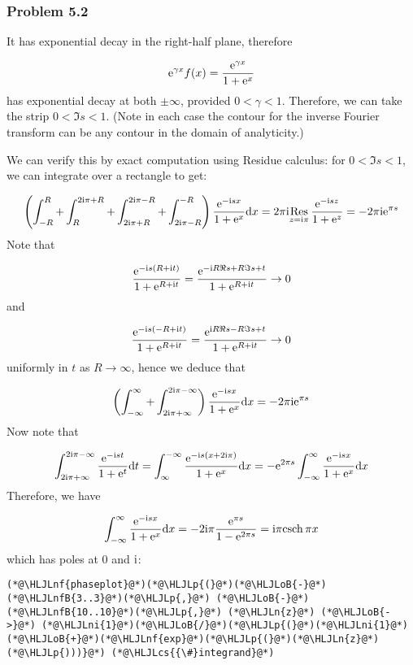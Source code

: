 \documentclass[12pt,a4paper]{article}
\newcommand{\HLJLn}[1]{#1}
\newcommand{\HLJLnf}[1]{\textcolor[RGB]{66,102,213}{#1}}
\newcommand{\HLJLnfB}[1]{\textcolor[RGB]{59,151,46}{#1}}
\newcommand{\HLJLni}[1]{\textcolor[RGB]{59,151,46}{#1}}
\newcommand{\HLJLoB}[1]{\textcolor[RGB]{102,102,102}{\textbf{#1}}}
\newcommand{\HLJLp}[1]{#1}
\newcommand{\HLJLcs}[1]{\textcolor[RGB]{153,153,119}{\textit{#1}}}
\def\D{ {\rm d} }
\def\I{ {\rm i} }
\def\E{ {\rm e} }
\def\Res_#1{\underset{#1}{\rm Res}\,}
\def\dx{\D x}
\def\dt{\D t}
\begin{document}
\subsubsection{Problem 5.2}
It has exponential decay in the right-half plane, therefore

\[
\E^{\gamma x} f(x) = {\E^{\gamma x } \over 1 + \E^x}
\]
has exponential decay at both $\pm \infty$, provided $0 < \gamma < 1$. Therefore, we can take the strip $0 < \Im s < 1$.  (Note in each case the contour for the inverse Fourier transform can be any contour in the domain of analyticity.)

We can verify this by exact computation using Residue calculus: for $0 < \Im s < 1$, we can integrate over a rectangle to get:

\[
\left(\int_{-R}^R + \int_R^{2\I \pi + R} +  \int_{2 \I \pi + R}^{2\I \pi - R} + \int_{2 \I \pi - R}^{-R} \right) {\E^{-\I s x} \over 1 + \E^x} \dx = 2 \pi \I \Res_{z = \I \pi } {\E^{-\I s z} \over 1 + \E^z} =
- 2 \pi \I \E^{\pi s}
\]
Note that

\[
{\E^{-\I s (R + \I t)} \over 1 + \E^{R + \I t}} =
{\E^{-\I R \Re s + R \Im s  + t} \over 1 + \E^{R + \I t}} \rightarrow 0
\]
and

\[
{\E^{-\I s (-R + \I t)} \over 1 + \E^{R + \I t}} =
{\E^{\I R \Re s - R \Im s + t} \over 1 + \E^{R + \I t}} \rightarrow 0
\]
uniformly in $t$ as $R \rightarrow \infty$, hence we deduce that

\[
\left(\int_{-\infty}^\infty  +  \int_{2 \I \pi + \infty}^{2\I \pi - \infty}\right) {\E^{-\I s x} \over 1 + \E^x} \dx  =
- 2 \pi \I \E^{\pi s}
\]
Now note that

\[
\int_{2 \I \pi + \infty}^{2\I \pi - \infty} {\E^{-\I s t} \over 1 + \E^t} \dt  = \int_{\infty}^{-\infty} {\E^{-\I s (x+2 \I \pi)} \over 1 + \E^x} \dx = -\E^{2 \pi s} \int_{-\infty}^\infty  {\E^{-\I s x} \over 1 + \E^x} \dx
\]
Therefore, we have

\[
\int_{-\infty}^\infty  {\E^{-\I s x} \over 1 + \E^x} \dx  = - 2 \I \pi {\E^{\pi s} \over 1 -\E^{2 \pi s}} = \I \pi {\rm csch}\, \pi x
\]
which has poles at $0$ and $\I$:


\begin{lstlisting}
(*@\HLJLnf{phaseplot}@*)(*@\HLJLp{(}@*)(*@\HLJLoB{-}@*)(*@\HLJLnfB{3..3}@*)(*@\HLJLp{,}@*) (*@\HLJLoB{-}@*)(*@\HLJLnfB{10..10}@*)(*@\HLJLp{,}@*) (*@\HLJLn{z}@*) (*@\HLJLoB{->}@*) (*@\HLJLni{1}@*)(*@\HLJLoB{/}@*)(*@\HLJLp{(}@*)(*@\HLJLni{1}@*)(*@\HLJLoB{+}@*)(*@\HLJLnf{exp}@*)(*@\HLJLp{(}@*)(*@\HLJLn{z}@*)(*@\HLJLp{)))}@*) (*@\HLJLcs{{\#}integrand}@*)
\end{lstlisting}
\end{document}
